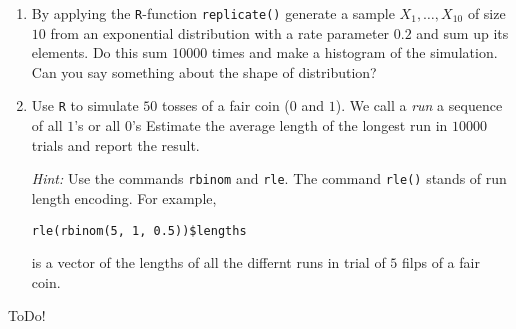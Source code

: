
\begin{exercise}[Simulations]

\phantom{}

\begin{enumerate}

    \item By applying the \texttt R-function \texttt{replicate()} generate a sample $X_1, \dots, X_{10}$ of size $10$ from an exponential distribution with a rate parameter $0.2$ and sum up its elements.
    Do this sum $10 000$ times and make a histogram of the simulation.
    Can you say something about the shape of distribution?

    \item Use \texttt R to simulate $50$ tosses of a fair coin ($0$ and $1$).
    We call a \textit{run} a sequence of all $1$'s or all $0$'s
    Estimate the average length of the longest run in $10 000$ trials and report the result.

    \textit{Hint:}
    Use the commands \texttt{rbinom} and \texttt{rle}.
    The command \texttt{rle()} stands of run length encoding.
    For example,

    \verb|rle(rbinom(5, 1, 0.5))$lengths|

    is a vector of the lengths of all the differnt runs in trial of $5$ filps of a fair coin.

\end{enumerate}

\end{exercise}


\begin{solution}

ToDo!

\end{solution}

